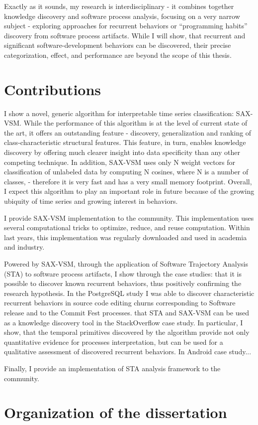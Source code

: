 Exactly as it sounds, my research is interdisciplinary - it combines together knowledge discovery and software process 
analysis, focusing on a very narrow subject - exploring approaches for recurrent behaviors or ``programming habits'' 
discovery from software process artifacts.
While I will show, that recurrent and significant software-development behaviors can be discovered,
their precise categorization, effect, and performance are beyond the scope of this thesis.

\section{Contributions}
I show a novel, generic algorithm for interpretable time series classification: SAX-VSM. 
While the performance of this algorithm is at the level of current state of the art, it offers an outstanding feature -
discovery, generalization and ranking of class-characteristic structural features. This feature, in turn, enables
knowledge discovery by offering much clearer insight into data specificity than any other competing technique.
In addition, SAX-VSM uses only N weight vectors for classification of unlabeled data by computing N cosines, where N is
a number of classes, - therefore it is very fast and has a very small memory footprint.
Overall, I expect this algorithm to play an important role in future because of the growing ubiquity of time series and
growing interest in behaviors.

I provide SAX-VSM implementation to the community. This implementation uses several computational tricks to optimize,
reduce, and reuse computation. Within last years, this implementation was regularly downloaded and used in academia and
industry. 

Powered by SAX-VSM, through the application of Software Trajectory Analysis (STA) to software process artifacts, I show
through the case studies: that it is possible to discover known recurrent behaviors, thus positively confirming the
research hypothesis. In the PostgreSQL study I was able to discover characteristic recurrent behaviors in source code
editing churns corresponding
to Software release and to the Commit Fest processes.
that STA and SAX-VSM can be used as a knowledge discovery tool in the StackOverflow case study. In particular, I show,
that the temporal primitives discovered by the algorithm provide not only quantitative evidence for processes
interpretation, but can be used for a qualitative assessment of discovered recurrent behaviors.
In Android case study...

Finally, I provide an implementation of STA analysis framework to the community. 

\section{Organization of the dissertation}